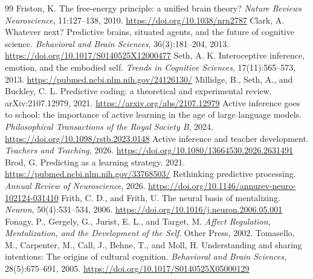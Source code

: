 \documentclass[UTF8,a4paper,11pt]{ctexart}
\begin{document}
\begin{thebibliography}{99}
 Friston, K. The free-energy principle: a unified brain theory? \emph{Nature Reviews Neuroscience}, 11:127--138, 2010. \url{https://doi.org/10.1038/nrn2787}
 Clark, A. Whatever next? Predictive brains, situated agents, and the future of cognitive science. \emph{Behavioral and Brain Sciences}, 36(3):181--204, 2013. \url{https://doi.org/10.1017/S0140525X12000477}
 Seth, A. K. Interoceptive inference, emotion, and the embodied self. \emph{Trends in Cognitive Sciences}, 17(11):565--573, 2013. \url{https://pubmed.ncbi.nlm.nih.gov/24126130/}
 Millidge, B., Seth, A., and Buckley, C. L. Predictive coding: a theoretical and experimental review. arXiv:2107.12979, 2021. \url{https://arxiv.org/abs/2107.12979}
 Active inference goes to school: the importance of active learning in the age of large language models. \emph{Philosophical Transactions of the Royal Society B}, 2024. \url{https://doi.org/10.1098/rstb.2023.0148}
 Active inference and teacher development. \emph{Teachers and Teaching}, 2026. \url{https://doi.org/10.1080/13664530.2026.2631491}
 Brod, G. Predicting as a learning strategy. 2021. \url{https://pubmed.ncbi.nlm.nih.gov/33768503/}
 Rethinking predictive processing. \emph{Annual Review of Neuroscience}, 2026. \url{https://doi.org/10.1146/annurev-neuro-102124-031410}
 Frith, C. D., and Frith, U. The neural basis of mentalizing. \emph{Neuron}, 50(4):531--534, 2006. \url{https://doi.org/10.1016/j.neuron.2006.05.001}
 Fonagy, P., Gergely, G., Jurist, E. L., and Target, M. \emph{Affect Regulation, Mentalization, and the Development of the Self}. Other Press, 2002.
 Tomasello, M., Carpenter, M., Call, J., Behne, T., and Moll, H. Understanding and sharing intentions: The origins of cultural cognition. \emph{Behavioral and Brain Sciences}, 28(5):675--691, 2005. \url{https://doi.org/10.1017/S0140525X05000129}
\end{thebibliography}
\end{document}
